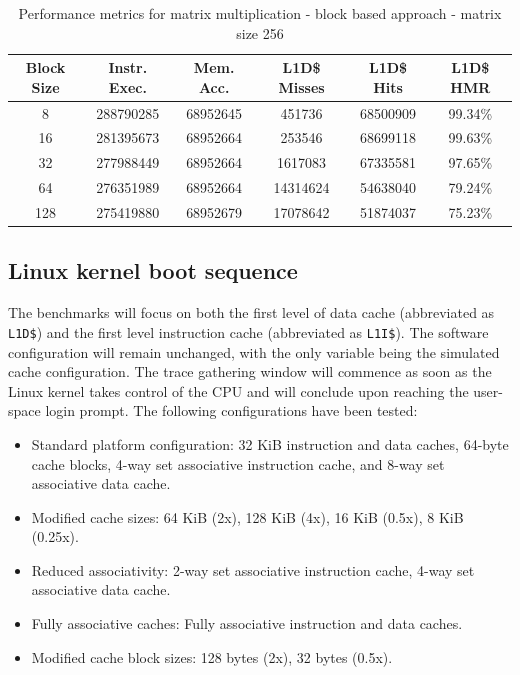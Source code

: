 \begin{center}
\begin{table}[!htbp]
\centering
\begin{tabular}{|c|c|c|c|c|c|}
\hline
\textbf{Block Size} & \textbf{Instr. Exec.} & \textbf{Mem. Acc.} & \textbf{L1D\$ Misses} & \textbf{L1D\$ Hits} & \textbf{L1D\$ HMR} \\ \hline
8 & 288790285 & 68952645 & 451736 & 68500909 & 99.34\% \\ \hline
16 & 281395673 & 68952664 & 253546 & 68699118 & 99.63\% \\ \hline
32 & 277988449 & 68952664 & 1617083 & 67335581 & 97.65\% \\ \hline
64 & 276351989 & 68952664 & 14314624 & 54638040 & 79.24\% \\ \hline
128 & 275419880 & 68952679 & 17078642 & 51874037 & 75.23\% \\ \hline
\end{tabular}
\caption{Performance metrics for matrix multiplication - block based approach - matrix size 256}
\label{tab:performance_metrics_256}
\end{table}
\end{center}

\subsection{Linux kernel boot sequence}

The benchmarks will focus on both the first level of data cache (abbreviated as \texttt{L1D\$}) and the first level instruction cache (abbreviated as \texttt{L1I\$}). The software
configuration will remain unchanged, with the only variable being the simulated cache configuration. The trace gathering window will commence as soon as the Linux kernel takes
control of the CPU and will conclude upon reaching the user-space login prompt. The following configurations have been tested:

\begin{itemize}
    \item Standard platform configuration: 32 KiB instruction and data caches, 64-byte cache blocks, 4-way set associative instruction cache, and 8-way set associative data cache.
    \item Modified cache sizes: 64 KiB (2x), 128 KiB (4x), 16 KiB (0.5x), 8 KiB (0.25x).
    \item Reduced associativity: 2-way set associative instruction cache, 4-way set associative data cache.
    \item Fully associative caches: Fully associative instruction and data caches.
    \item Modified cache block sizes: 128 bytes (2x), 32 bytes (0.5x).
\end{itemize}

